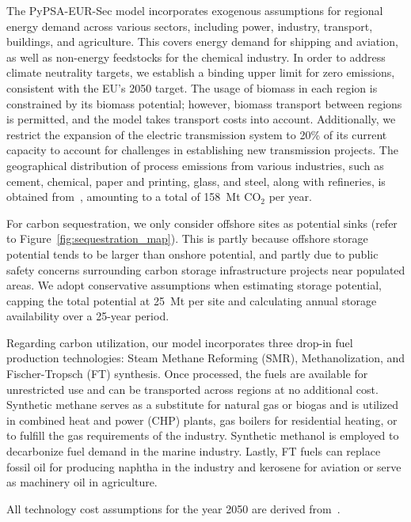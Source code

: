 \documentclass[conference]{IEEEtran}
\newcommand{\carbon}{CO$_2$ }
\begin{document}
The PyPSA-EUR-Sec model incorporates exogenous assumptions for regional energy demand across various sectors, including power, industry, transport, buildings, and agriculture. This covers energy demand for shipping and aviation, as well as non-energy feedstocks for the chemical industry. In order to address climate neutrality targets, we establish a binding upper limit for zero emissions, consistent with the EU's 2050 target. The usage of biomass in each region is constrained by its biomass potential; however, biomass transport between regions is permitted, and the model takes transport costs into account. Additionally, we restrict the expansion of the electric transmission system to 20\% of its current capacity to account for challenges in establishing new transmission projects. The geographical distribution of process emissions from various industries, such as cement, chemical, paper and printing, glass, and steel, along with refineries, is obtained from~\cite{piamanzGeoreferencedIndustrialSites2018}, amounting to a total of 158~Mt \carbon per year.

For carbon sequestration, we only consider offshore sites as potential sinks (refer to Figure~\ref{fig:sequestration_map}). This is partly because offshore storage potential tends to be larger than onshore potential, and partly due to public safety concerns surrounding carbon storage infrastructure projects near populated areas. We adopt conservative assumptions when estimating storage potential, capping the total potential at 25~Mt per site and calculating annual storage availability over a 25-year period.

Regarding carbon utilization, our model incorporates three drop-in fuel production technologies: Steam Methane Reforming (SMR), Methanolization, and Fischer-Tropsch (FT) synthesis. Once processed, the fuels are available for unrestricted use and can be transported across regions at no additional cost. Synthetic methane serves as a substitute for natural gas or biogas and is utilized in combined heat and power (CHP) plants, gas boilers for residential heating, or to fulfill the gas requirements of the industry. Synthetic methanol is employed to decarbonize fuel demand in the marine industry. Lastly, FT fuels can replace fossil oil for producing naphtha in the industry and kerosene for aviation or serve as machinery oil in agriculture.

All technology cost assumptions for the year 2050 are derived from~\cite{lisazeyenPyPSATechnologydataTechnology2023}.
\end{document}
